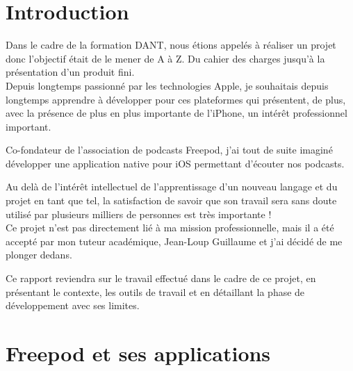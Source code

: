 \documentclass[11pt, french]{report}
\begin{document}



\tableofcontents





     								
\chapter*{Introduction}

Dans le cadre de la formation DANT, nous étions appelés à réaliser un projet donc l'objectif était de le mener de A à Z. Du cahier des charges jusqu'à la présentation d'un produit fini.\\

Depuis longtemps passionné par les technologies Apple, je souhaitais depuis longtemps apprendre à développer pour ces plateformes qui présentent, de plus, avec la présence de plus en plus importante de l'iPhone, un intérêt professionnel important.

Co-fondateur de l'association de podcasts Freepod, j'ai tout de suite imaginé développer une application native pour iOS permettant d'écouter nos podcasts.

Au delà de l'intérêt intellectuel de l'apprentissage d'un nouveau langage et du projet en tant que tel, la satisfaction de savoir que son travail sera sans doute utilisé par plusieurs milliers de personnes est très importante !\\

Ce projet n'est pas directement lié à ma mission professionnelle, mais il a été accepté par mon tuteur académique, Jean-Loup Guillaume et j'ai décidé de me plonger dedans.

Ce rapport reviendra sur le travail effectué dans le cadre de ce projet, en présentant le contexte, les outils de travail et en détaillant la phase de développement avec ses limites.



\chapter{Freepod et ses applications}
\end{document}
